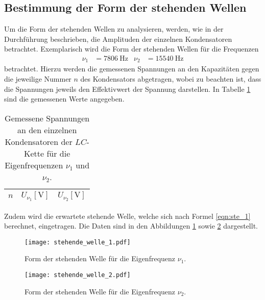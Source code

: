 \subsection{Bestimmung der Form der stehenden Wellen}
Um die Form der stehenden Wellen zu analysieren, werden, wie in der Durchführung beschrieben, die Amplituden der einzelnen Kondensatoren betrachtet.
Exemplarisch wird die Form der stehenden Wellen für die Frequenzen
\begin{align*}
  \nu_1 &= \SI{7806}{\hertz} & \nu_2 &= \SI{15540}{\hertz}
\end{align*}
betrachtet.
Hierzu werden die gemessenen Spannungen an den Kapazitäten gegen die jeweilige Nummer $n$ des Kondensators abgetragen, wobei zu beachten ist, dass die Spannungen jeweils den Effektivwert der Spannung darstellen.
In Tabelle \ref{tab:stehend1} sind die gemessenen Werte angegeben.
\begin{table}
  \centering
  \caption{Gemessene Spannungen an den einzelnen Kondensatoren der $LC$-Kette für die Eigenfrequenzen $\nu_1$ und $\nu_2$.}
  \label{tab:stehend1}
  \begin{tabular}{c c c}
    \toprule
    {$n$} & {$U_{\nu_1} [\si{\volt}]$} & {$U_{\nu_2} [\si{\volt}]$}\\
    \midrule
    
    \bottomrule
  \end{tabular}
\end{table}

Zudem wird die erwartete stehende Welle, welche sich nach Formel \eqref{eqn:ste_1} berechnet, eingetragen.
Die Daten sind in den Abbildungen \ref{fig:stehend1} sowie \ref{fig:stehend2} dargestellt.

\begin{figure}[H]
  \centering
  \texttt{[image: stehende\_welle\_1.pdf]}
  \caption{Form der stehenden Welle für die Eigenfrequenz $\nu_1$.}
  \label{fig:stehend1}
\end{figure}

\begin{figure}[H]
  \centering
  \texttt{[image: stehende\_welle\_2.pdf]}
  \caption{Form der stehenden Welle für die Eigenfrequenz $\nu_2$.}
  \label{fig:stehend2}
\end{figure}

